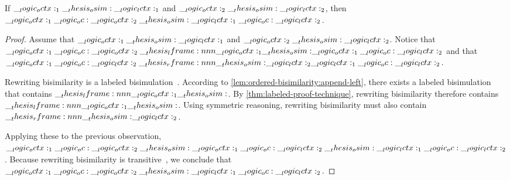 


\begin{theorem}
  If $\__logic_octx:_1 \__thesis_osim: \__logic_lctx:_1$ and $\__logic_octx:_2 \__thesis_osim: \__logic_lctx:_2$, then $\__logic_octx:_1 \__logic_oc: \__logic_octx:_2 \__thesis_osim: \__logic_lctx:_1 \__logic_oc: \__logic_lctx:_2$.
\end{theorem}
\begin{proof}
  Assume that $\__logic_octx:_1 \__thesis_osim: \__logic_lctx:_1$ and $\__logic_octx:_2 \__thesis_osim: \__logic_lctx:_2$.
  Notice that $\octx_1 \oc \octx_2 \lframe{\octx_1}{\osim} \octx_1 \oc \lctx_2$ and that $\octx_1 \oc \lctx_2 \rframe{\osim}{\lctx_2} \lctx_1 \oc \lctx_2$.

  Rewriting bisimilarity is a labeled bisimulation~.
  According to \cref{lem:ordered-bisimilarity:append-left}, there exists a labeled bisimulation that contains $\lframe{\octx_1}{\osim}$.
  By \cref{thm:labeled-proof-technique}, rewriting bisimilarity therefore contains $\lframe{\octx_1}{\osim}$.
  Using symmetric reasoning, rewriting bisimilarity must also contain $\rframe{\osim}{\lctx_2}$.

  Applying these to the previous observation, $\__logic_octx:_1 \__logic_oc: \__logic_octx:_2 \__thesis_osim: \__logic_octx:_1 \__logic_oc: \__logic_lctx:_2 \__thesis_osim: \__logic_lctx:_1 \__logic_oc: \__logic_lctx:_2$.
  Because rewriting bisimilarity is transitive~, we conclude that $\__logic_octx:_1 \__logic_oc: \__logic_octx:_2 \__thesis_osim: \__logic_lctx:_1 \__logic_oc: \__logic_lctx:_2$.
\end{proof}

